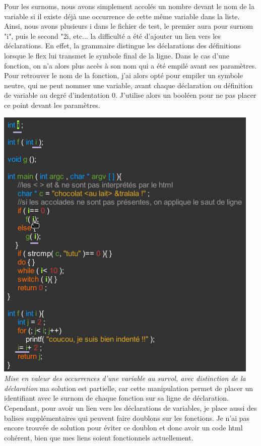 \documentclass[10pt,a4paper]{report}
\begin{document}
Pour les surnoms, nous avons simplement accolés un nombre devant le nom de la variable si il existe déjà une occurrence  de cette même variable dans la liste. Ainsi, nous avons plusieurs i dans le fichier de test, le premier aura pour surnom "i", puis le second "2i, etc... \newline
la difficulté a été d'ajouter un lien vers les déclarations. En effet, la grammaire distingue les déclarations des définitions lorsque le flex lui transmet le symbole final de la ligne. \newline 
Dans le cas d'une fonction, on n'a alors plus accès à son nom qui a été empilé avant ses paramètres.
\newline 
Pour retrouver le nom de la fonction, j'ai alors opté pour empiler un symbole neutre, qui ne peut nommer une variable, avant chaque déclaration ou définition de variable au degré d'indentation 0. J'utilise alors un booléen pour ne pas placer ce point devant les paramètres. \newline

	\includegraphics{survol.png} 
	\newline
\textit{Mise en valeur des occurrences d'une variable au survol, avec distinction de la déclaration}
\newline \newline
ma solution est partielle, car cette manipulation permet de placer un identifiant avec le surnom de chaque fonction sur sa ligne de déclaration. Cependant, pour avoir un lien vers les déclarations de variables, je place aussi des balises supplémentaires qui peuvent faire doublons sur les fonctions. Je n'ai pas encore trouvée de solution pour éviter ce doublon et donc avoir un code html cohérent, bien que mes liens soient fonctionnels actuellement. \newline
\end{document}

